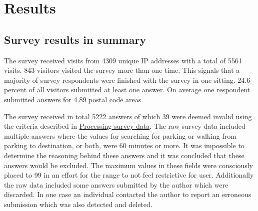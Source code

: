\section{Results}
\justify

\subsection{Survey results in summary}
\justify
The survey received visits from 4309 unique IP addresses with a total of 5561 visits. 843 visitors visited the survey more than one time. This signals that a majority of survey respondents were finished with the survey in one sitting. 24.6 percent of all visitors submitted at least one answer. On average one respondent submitted answers for 4.89 postal code areas.

The survey received in total 5222 answers of which 39 were deemed invalid using the criteria described in \hyperref[sec:processdata]{Processing survey data}. The raw survey data included multiple answers where the values for searching for parking or walking from parking to destination, or both, were 60 minutes or more. It was impossible to determine the reasoning behind these answers and it was concluded that these answers would be excluded. The maximum values in these fields were consciously placed to 99 in an effort for the range to not feel restrictive for user. Additionally the raw data included some answers submitted by the author which were discarded. In one case an individual contacted the author to report an erroneous submission which was also detected and deleted. 

